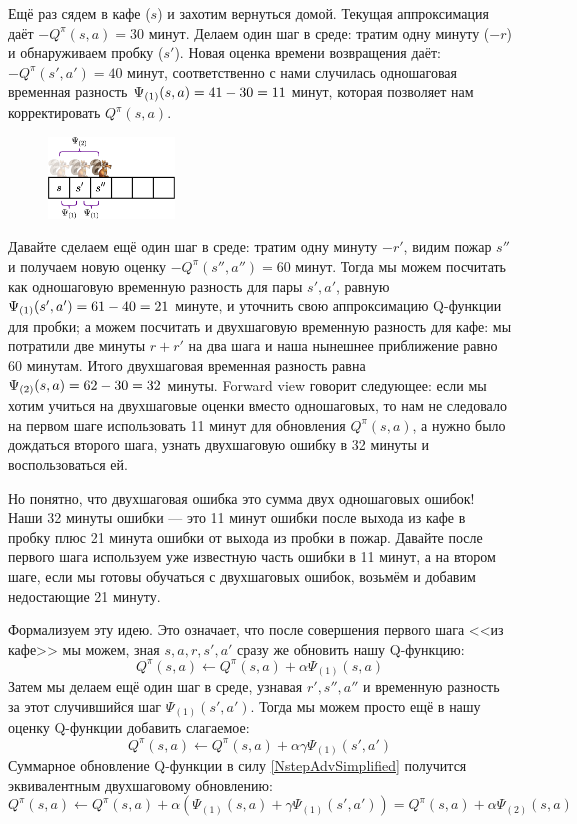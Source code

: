 \begin{example}
Ещё раз сядем в кафе ($s$) и захотим вернуться домой. Текущая аппроксимация даёт $-Q^\pi(s, a) = 30$ минут. Делаем один шаг в среде: тратим одну минуту ($-r$) и обнаруживаем пробку ($s'$). Новая оценка времени возвращения даёт: $-Q^\pi(s', a') = 40$ минут, соответственно с нами случилась одношаговая временная разность $\Psi_{(1)}(s, a) = 41 - 30 \HM= 11$ минут, которая позволяет нам корректировать $Q^\pi(s, a)$.

\begin{figure}
\vspace{-0.3cm}
\centering
\includegraphics[width=0.3\textwidth]{Images/MultiStepErrors3.png}
\vspace{-0.3cm}
\end{figure}

Давайте сделаем ещё один шаг в среде: тратим одну минуту $-r'$, видим пожар $s''$ и получаем новую оценку $-Q^\pi(s'', a'') = 60$ минут. Тогда мы можем посчитать как одношаговую временную разность для пары $s', a'$, равную $\Psi_{(1)}(s', a') \HM= 61 \HM- 40 \HM= 21$ минуте, и уточнить свою аппроксимацию Q-функции для пробки; а можем посчитать и двухшаговую временную разность для кафе: мы потратили две минуты $r + r'$ на два шага и наша нынешнее приближение равно 60 минутам. Итого двухшаговая временная разность равна $\Psi_{(2)}(s, a) \HM= 62 - 30 = 32$ минуты. Forward view говорит следующее: если мы хотим учиться на двухшаговые оценки вместо одношаговых, то нам не следовало на первом шаге использовать 11 минут для обновления $Q^\pi(s, a)$, а нужно было дождаться второго шага, узнать двухшаговую ошибку в 32 минуты и воспользоваться ей.

Но понятно, что двухшаговая ошибка это сумма двух одношаговых ошибок! Наши 32 минуты ошибки --- это 11 минут ошибки после выхода из кафе в пробку плюс 21 минута ошибки от выхода из пробки в пожар. Давайте после первого шага используем уже известную часть ошибки в 11 минут, а на втором шаге, если мы готовы обучаться с двухшаговых ошибок, возьмём и добавим недостающие 21 минуту.
\end{example}

Формализуем эту идею. Это означает, что после совершения первого шага <<из кафе>> мы можем, зная $s, a, r, s', a'$ сразу же обновить нашу Q-функцию:
$$
Q^{\pi}(s, a) \leftarrow Q^{\pi}(s, a) + \alpha \Psi_{(1)}(s, a)
$$
Затем мы делаем ещё один шаг в среде, узнавая $r', s'', a''$ и временную разность за этот случившийся шаг $\Psi_{(1)}(s', a')$. Тогда мы можем просто ещё в нашу оценку Q-функции добавить слагаемое:
$$
Q^{\pi}(s, a) \leftarrow Q^{\pi}(s, a) + \alpha \gamma \Psi_{(1)}(s', a')
$$
Суммарное обновление Q-функции в силу \eqref{NstepAdvSimplified} получится эквивалентным двухшаговому обновлению:
$$
Q^{\pi}(s, a) \leftarrow Q^{\pi}(s, a) + \alpha (\Psi_{(1)}(s, a) + \gamma \Psi_{(1)}(s', a')) = Q^{\pi}(s, a) + \alpha \Psi_{(2)}(s, a)
$$

